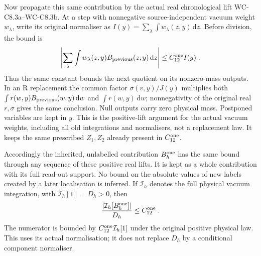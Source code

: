 \documentclass[11pt]{article}
\newcommand{\dd}{\mathrm{d}}
\begin{document}
Now propagate this same contribution by the actual real
chronological lift WC-C8.3a--WC-C8.3b. At a step with
nonnegative source-independent vacuum weight $w_\lambda$,
write its original normaliser as $I(y)=\sum_\lambda
\int w_\lambda(z,y)\,\dd z$. Before division, the bound is
\begin{equation}\label{eq:c8-fourth-connecting-lift}
    \left|\sum_\lambda\int
        w_\lambda(z,y)B_{\rm previous}(z,y)\,\dd z\right|
        \leq C_{12}^{\rm one}I(y)\;.
\end{equation}
Thus the same constant bounds the next quotient on its
nonzero-mass outputs. In an R replacement the common factor
$\sigma(v,y)/J(y)$ multiplies both
$\int r(w,y)B_{\rm previous}(w,y)\,\dd w$ and
$\int r(w,y)\,\dd w$; nonnegativity of the original real
$r,\sigma$ gives the same conclusion. Null outputs carry
zero physical mass. Postponed variables are kept in $y$.
This is the positive-lift argument for the actual vacuum
weights, including all old integrations and normalisers,
not a replacement law. It keeps the same prescribed
$Z_1,Z_2$ already present in
$C_{12}^{\rm one}$.

Accordingly the inherited, unlabelled contribution $B_h^{\rm one}$
has the same bound through any sequence of these positive
real lifts. It is kept as a whole contribution with its full
read-out support. No bound on the absolute values of new
labels created by a later localisation is inferred.
If $\mathcal I_h$ denotes the full physical vacuum integration,
with $\mathcal I_h[1]=D_h>0$, then
\begin{equation}\label{eq:c8-fourth-connecting-physical}
    \frac{|\mathcal I_h[B_h^{\rm one}]|}{D_h}
        \leq C_{12}^{\rm one}\;.
\end{equation}
The numerator is bounded by $C_{12}^{\rm one}\mathcal I_h[1]$
under the original positive physical law. This uses its
actual normalisation; it does not replace $D_h$ by a
conditional component normaliser.
\end{document}
